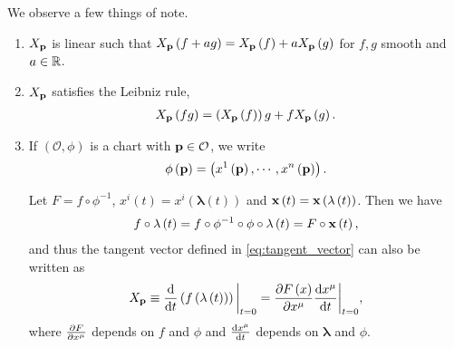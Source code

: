 We observe a few things of note.
\begin{enumerate}[label=\arabic*)]
    \item $X_{\vb{p}}$ is linear such that $X_{\vb{p}}\left( f + a g \right) = X_{\vb{p}}\left( f \right)  + a X_{\vb{p}} \left( g \right) $ for $f,g$ smooth and $a \in \mathbb{R}$.
    \item $X_{\vb{p}}$ satisfies the Leibniz rule,
        \begin{align}
            X_{\vb{p}}\left( fg \right) = \left( X_{\vb{p}}\left( f \right)  \right) g  + f X_{\vb{p}} \left( g  \right) 
        .\end{align}
    \item If $\left( \mathcal{O}, \phi \right) $ is a chart with $\vb{p} \in \mathcal{O}$, we write
        \begin{align}
            \phi \left( \vb{p} \right) = \left( x^{1} \left( \vb{p} \right) , \cdots, x^{n} \left( \vb{p} \right)  \right) 
        .\end{align}

        Let $F = f \circ \phi^{-1}$, $x^{i} \left( t \right) = x^{i} \left( \mathbf{\lambda} \left( t \right)  \right) $ and $\vb{x}\left( t \right) = \vb{x}\left( \lambda \left( t \right)  \right) $. Then we have
        \begin{align}
            f \circ \mathbf{\lambda} \left( t \right) = f \circ \phi^{-1} \circ \phi \circ \mathbf{\lambda} \left( t \right) = F \circ \vb{x} \left( t \right) 
        ,\end{align}
        and thus the tangent vector defined in \cref{eq:tangent_vector} can also be written as
        \begin{align}
            X_{\vb{p}} \equiv \dv{t} \left( f \left( \mathbf{\lambda} \left( t \right)  \right)  \right) \bigg|_{t = 0} = \pdv{F\left( x \right) }{x^{\mu}}  \dv{x^{\mu}}{t} \bigg|_{t = 0}
        ,\end{align}
        where $\pdv{F}{x^{\mu}}$ depends on $f$ and $\phi$ and $\dv{x^{\mu}}{t}$ depends on $\mathbf{\lambda}$ and $\phi$.
\end{enumerate}

